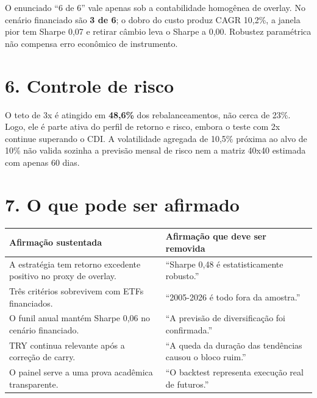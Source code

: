 \documentclass[10pt,a4paper]{article}
\begin{document}
O enunciado ``6 de 6'' vale apenas sob a contabilidade homogênea de overlay. No
cenário financiado são \textbf{3 de 6}; o dobro do custo produz CAGR 10,2\%, a
janela pior tem Sharpe 0,07 e retirar câmbio leva o Sharpe a 0,00. Robustez
paramétrica não compensa erro econômico de instrumento.

\section*{6. Controle de risco}
O teto de 3x é atingido em \textbf{48,6\%} dos rebalanceamentos, não cerca de
23\%. Logo, ele é parte ativa do perfil de retorno e risco, embora o teste com
2x continue superando o CDI. A volatilidade agregada de 10,5\% próxima ao alvo
de 10\% não valida sozinha a previsão mensal de risco nem a matriz 40x40
estimada com apenas 60 dias.

\newpage
\section*{7. O que pode ser afirmado}

{\small\begin{tabularx}{\textwidth}{>{\raggedright\arraybackslash}X >{\raggedright\arraybackslash}X}
\toprule
Afirmação sustentada & Afirmação que deve ser removida\\
\midrule
A estratégia tem retorno excedente positivo no proxy de overlay. & ``Sharpe 0,48 é
estatisticamente robusto.''\\
Três critérios sobrevivem com ETFs financiados. & ``2005-2026 é todo
fora da amostra.''\\
O funil anual mantém Sharpe 0,06 no cenário financiado. & ``A previsão de
diversificação foi confirmada.''\\
TRY continua relevante após a correção de carry. & ``A queda da duração das
tendências causou o bloco ruim.''\\
O painel serve a uma prova acadêmica transparente. & ``O backtest representa
execução real de futuros.''\\
\bottomrule
\end{tabularx}}
\end{document}
